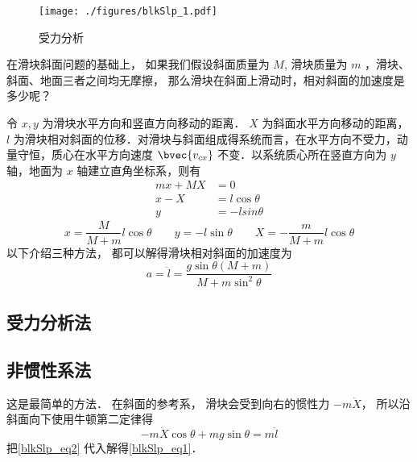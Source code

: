
\begin{issues}
\issueTODO
\end{issues}


\begin{figure}[ht]
\centering
\texttt{[image: ./figures/blkSlp\_1.pdf]}
\caption{受力分析} \label{blkSlp_fig1}
\end{figure}

在滑块斜面问题的基础上， 如果我们假设斜面质量为 $M$, 滑块质量为 $m$ ，滑块、斜面、地面三者之间均无摩擦， 那么滑块在斜面上滑动时，相对斜面的加速度是多少呢？

令 $x, y$ 为滑块水平方向和竖直方向移动的距离． $X$ 为斜面水平方向移动的距离， $l$ 为滑块相对斜面的位移．对滑块与斜面组成得系统而言，在水平方向不受力，动量守恒，质心在水平方向速度 $\bvec{v_{cx}}$ 不变．以系统质心所在竖直方向为 $y$ 轴，地面为 $x$ 轴建立直角坐标系，则有
\begin{equation}
\begin{aligned}
mx+MX&=0\\
x-X&=l\cos\theta\\
y&=-lsin\theta
\end{aligned}
\end{equation}
\begin{equation}\label{blkSlp_eq2}
x = \frac{M}{M + m}l\cos\theta
\qquad
y = -l\sin\theta
\qquad
X = -\frac{m}{M + m}l\cos\theta
\end{equation}
以下介绍三种方法， 都可以解得滑块相对斜面的加速度为
\begin{equation}\label{blkSlp_eq1}
a = \ddot l = \frac{g\sin\theta(M+m)}{M + m\sin^2\theta}
\end{equation}

\subsection{受力分析法}

\subsection{非惯性系法}
这是最简单的方法． 在斜面的参考系， 滑块会受到向右的惯性力 $-m\ddot X$， 所以沿斜面向下使用牛顿第二定律得
\begin{equation}
-m\ddot X\cos\theta + mg\sin\theta = m\ddot l
\end{equation}
把\autoref{blkSlp_eq2} 代入解得\autoref{blkSlp_eq1}．

